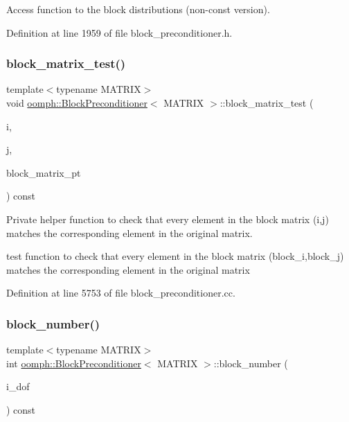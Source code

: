 Access function to the block distributions (non-\/const version). 



Definition at line 1959 of file block\+\_\+preconditioner.\+h.

\mbox{\label{classoomph_1_1BlockPreconditioner_a4d8ff67e34e85a71c0f9bb68c0b10496}} 
\subsubsection{\texorpdfstring{block\+\_\+matrix\+\_\+test()}{block\_matrix\_test()}}
{\footnotesize\ttfamily template$<$typename M\+A\+T\+R\+IX$>$ \\
void \hyperlink{classoomph_1_1BlockPreconditioner}{oomph\+::\+Block\+Preconditioner}$<$ M\+A\+T\+R\+IX $>$\+::block\+\_\+matrix\+\_\+test (\begin{DoxyParamCaption}\item[{const unsigned \&}]{i,  }\item[{const unsigned \&}]{j,  }\item[{const M\+A\+T\+R\+IX $\ast$}]{block\+\_\+matrix\+\_\+pt }\end{DoxyParamCaption}) const}



Private helper function to check that every element in the block matrix (i,j) matches the corresponding element in the original matrix. 

test function to check that every element in the block matrix (block\+\_\+i,block\+\_\+j) matches the corresponding element in the original matrix 

Definition at line 5753 of file block\+\_\+preconditioner.\+cc.

\mbox{\label{classoomph_1_1BlockPreconditioner_a8a64cfc57ffd16b92ac78499de515138}} 
\subsubsection{\texorpdfstring{block\+\_\+number()}{block\_number()}}
{\footnotesize\ttfamily template$<$typename M\+A\+T\+R\+IX$>$ \\
int \hyperlink{classoomph_1_1BlockPreconditioner}{oomph\+::\+Block\+Preconditioner}$<$ M\+A\+T\+R\+IX $>$\+::block\+\_\+number (\begin{DoxyParamCaption}\item[{const unsigned \&}]{i\+\_\+dof }\end{DoxyParamCaption}) const\hspace{0.3cm}{\ttfamily [inline]}}



